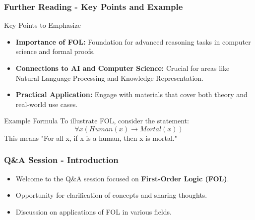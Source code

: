 \documentclass[aspectratio=169]{beamer}
\begin{document}
\begin{frame}[fragile]
    \frametitle{Further Reading - Key Points and Example}
    \begin{block}{Key Points to Emphasize}
        \begin{itemize}
            \item \textbf{Importance of FOL:} Foundation for advanced reasoning tasks in computer science and formal proofs.
            \item \textbf{Connections to AI and Computer Science:} Crucial for areas like Natural Language Processing and Knowledge Representation.
            \item \textbf{Practical Application:} Engage with materials that cover both theory and real-world use cases.
        \end{itemize}
    \end{block}
    
    \begin{block}{Example Formula}
        To illustrate FOL, consider the statement:
        \begin{equation}
            \forall x (Human(x) \rightarrow Mortal(x))
        \end{equation}
        This means "For all x, if x is a human, then x is mortal."
    \end{block}
\end{frame}

\begin{frame}[fragile]
  \frametitle{Q\&A Session - Introduction}
  \begin{itemize}
    \item Welcome to the Q\&A session focused on \textbf{First-Order Logic (FOL)}.
    \item Opportunity for clarification of concepts and sharing thoughts.
    \item Discussion on applications of FOL in various fields.
  \end{itemize}
\end{frame}
\end{document}
